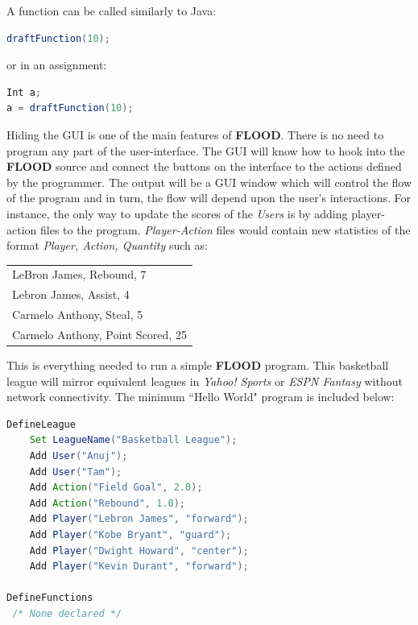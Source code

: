 \documentclass[12pt]{report}
\begin{document}
A function can be called similarly to Java:

\begin{singlespace}
\begin{lstlisting}[language=Java,label=some-code,caption={Function call.}]
draftFunction(10);
\end{lstlisting}
\end{singlespace}

or in an assignment:

\begin{singlespace}
\begin{lstlisting}[language=Java,label=some-code,caption={Function call in an assignment.}]
Int a;
a = draftFunction(10);
\end{lstlisting}
\end{singlespace}

Hiding the GUI is one of the main features of \textbf{FLOOD}. There is no need to program any part of the user-interface. The GUI will know how to hook into the \textbf{FLOOD} source and connect the buttons on the interface to the actions defined by the programmer. The output will be a GUI window which will control the flow of the program and in turn, the flow will depend upon the user's interactions. For instance, the only way to update the scores of the \textit{Users} is by adding player-action files to the program. \textit{Player-Action} files would contain new statistics of the format \textit{Player, Action, Quantity} such as:
\begin{center}
\begin{singlespace}
\begin{tabular}{ l }
LeBron James, Rebound, 7 \\
Lebron James, Assist, 4  \\
Carmelo Anthony, Steal, 5 \\
Carmelo Anthony, Point Scored, 25
\end{tabular}
\end{singlespace}
\end{center}

This is everything needed to run a simple \textbf{FLOOD} program. This basketball league will mirror equivalent leagues in \textit{Yahoo! Sports} or \textit{ESPN Fantasy} without network connectivity. The minimum ``Hello World" program is included below:

\begin{singlespace}
\begin{lstlisting}[language=Java,label=some-code,caption={Minimal FLOOD program to create a basektball fantasy league.}]
DefineLeague
	Set LeagueName("Basketball League");
	Add User("Anuj");
	Add User("Tam");
	Add Action("Field Goal", 2.0);
	Add Action("Rebound", 1.0);
	Add Player("Lebron James", "forward");
	Add Player("Kobe Bryant", "guard");
	Add Player("Dwight Howard", "center");
	Add Player("Kevin Durant", "forward");

DefineFunctions
 /* None declared */
\end{lstlisting}
\end{singlespace}
\end{document}
